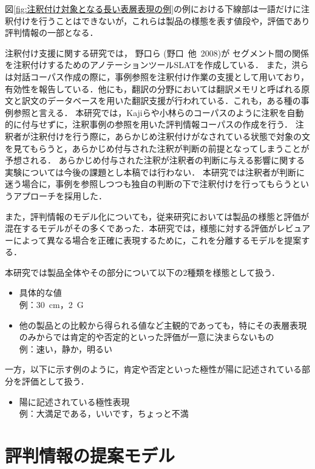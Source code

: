 \documentclass[japanese]{jnlp_1.4}
\begin{document}
図\ref{fig:注釈付け対象となる長い表層表現の例}の例における下線部は一語だけに注釈付けを行うことはできないが，これらは製品の様態を表す値段や，評価であり評判情報の一部となる．


注釈付け支援に関する研究では，
    野口ら (野口\ 他\ 2008)\nocite{Noguchi08}が
セグメント間の関係を注釈付けするためのアノテーションツールSLATを作成している．
また，洪らは対話コーパス作成の際に，事例参照を注釈付け作業の支援として用いており，有効性を報告している．他にも，翻訳の分野においては翻訳メモリと呼ばれる原文と訳文のデータベースを用いた翻訳支援が行われている．これも，ある種の事例参照と言える．
本研究では，Kajiら\cite{Kaji06}や小林ら\cite{kobayashi06}のコーパスのように注釈を自動的に付与せずに，注釈事例の参照を用いた評判情報コーパスの作成を行う．
注釈者が注釈付けを行う際に，あらかじめ注釈付けがなされている状態で対象の文を見てもらうと，あらかじめ付与された注釈が判断の前提となってしまうことが予想される．
あらかじめ付与された注釈が注釈者の判断に与える影響に関する実験については今後の課題とし本稿では行わない．
本研究では注釈者が判断に迷う場合に，事例を参照しつつも独自の判断の下で注釈付けを行ってもらうというアプローチを採用した．

また，評判情報のモデル化についても，従来研究においては製品の様態と評価が混在するモデルがその多くであった．本研究では，様態に対する評価がレビュアーによって異なる場合を正確に表現するために，これを分離するモデルを提案する．

本研究では製品全体やその部分について以下の2種類を様態として扱う．

\begin{itemize}
\item
具体的な値\\
例：30~cm，2~G
\item
他の製品との比較から得られる値など主観的であっても，特にその表層表現のみからでは肯定的や否定的といった評価が一意に決まらないもの\\
例：速い，静か，明るい
\end{itemize}


一方，以下に示す例のように，肯定や否定といった極性が陽に記述されている部分を評価として扱う．

\begin{itemize}
\item
陽に記述されている極性表現\\
例：大満足である，いいです，ちょっと不満
\end{itemize}




\section{評判情報の提案モデル}
\label{sec:評判情報の提案モデル}
\end{document}
